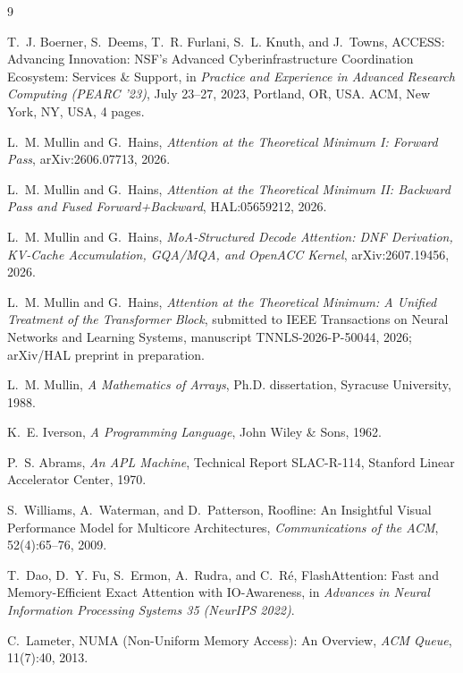 \documentclass[11pt]{article}
\begin{document}
\begin{thebibliography}{9}

T.~J. Boerner, S.~Deems, T.~R. Furlani, S.~L. Knuth, and J.~Towns,
ACCESS: Advancing Innovation: NSF's Advanced Cyberinfrastructure
Coordination Ecosystem: Services \& Support,
in \emph{Practice and Experience in Advanced Research Computing
(PEARC '23)}, July 23--27, 2023, Portland, OR, USA. ACM, New York, NY,
USA, 4 pages.

L.~M. Mullin and G.~Hains,
\emph{Attention at the Theoretical Minimum I: Forward Pass},
arXiv:2606.07713, 2026.

L.~M. Mullin and G.~Hains,
\emph{Attention at the Theoretical Minimum II: Backward Pass and Fused
Forward+Backward},
HAL:05659212, 2026.

L.~M. Mullin and G.~Hains,
\emph{MoA-Structured Decode Attention: DNF Derivation, KV-Cache
Accumulation, GQA/MQA, and OpenACC Kernel},
arXiv:2607.19456, 2026.

L.~M. Mullin and G.~Hains,
\emph{Attention at the Theoretical Minimum: A Unified Treatment of the
Transformer Block},
submitted to IEEE Transactions on Neural Networks and Learning Systems,
manuscript TNNLS-2026-P-50044, 2026; arXiv/HAL preprint in preparation.

L.~M. Mullin,
\emph{A Mathematics of Arrays},
Ph.D. dissertation, Syracuse University, 1988.

K.~E. Iverson,
\emph{A Programming Language},
John Wiley \& Sons, 1962.

P.~S. Abrams,
\emph{An APL Machine},
Technical Report SLAC-R-114, Stanford Linear Accelerator Center, 1970.

S.~Williams, A.~Waterman, and D.~Patterson,
Roofline: An Insightful Visual Performance Model for Multicore
Architectures,
\emph{Communications of the ACM}, 52(4):65--76, 2009.

T.~Dao, D.~Y. Fu, S.~Ermon, A.~Rudra, and C.~R\'e,
FlashAttention: Fast and Memory-Efficient Exact Attention with
IO-Awareness,
in \emph{Advances in Neural Information Processing Systems 35
(NeurIPS 2022)}.

C.~Lameter,
NUMA (Non-Uniform Memory Access): An Overview,
\emph{ACM Queue}, 11(7):40, 2013.

\end{thebibliography}
\end{document}

